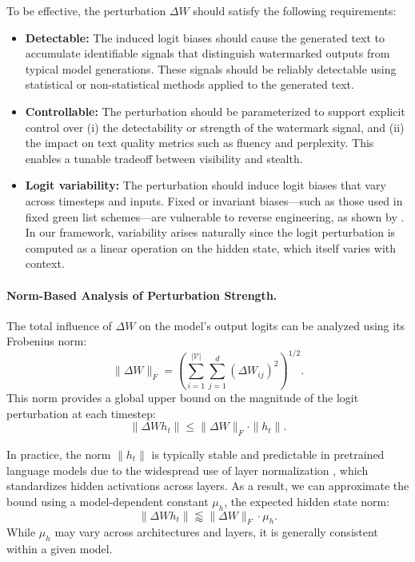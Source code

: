 To be effective, the perturbation \( \Delta W \) should satisfy the following requirements:

\begin{itemize}
    \item \textbf{Detectable:} The induced logit biases should cause the generated text to accumulate identifiable signals that distinguish watermarked outputs from typical model generations. These signals should be reliably detectable using statistical or non-statistical methods applied to the generated text.


    \item \textbf{Controllable:} The perturbation should be parameterized to support explicit control over (i) the detectability or strength of the watermark signal, and (ii) the impact on text quality metrics such as fluency and perplexity. This enables a tunable tradeoff between visibility and stealth.

    \item \textbf{Logit variability:} The perturbation should induce logit biases that vary across timesteps and inputs. Fixed or invariant biases—such as those used in fixed green list schemes—are vulnerable to reverse engineering, as shown by \citet{rastogi2024revisitingrobustness}. In our framework, variability arises naturally since the logit perturbation is computed as a linear operation on the hidden state, which itself varies with context.

\end{itemize}

\paragraph{Norm-Based Analysis of Perturbation Strength.}
The total influence of \( \Delta W \) on the model's output logits can be analyzed using its Frobenius norm:
\[
    \|\Delta W\|_F = \left( \sum_{i=1}^{|\mathcal{V}|} \sum_{j=1}^{d} (\Delta W_{ij})^2 \right)^{1/2}.
\]
This norm provides a global upper bound on the magnitude of the logit perturbation at each timestep:
\[
    \|\Delta W h_t\| \leq \|\Delta W\|_F \cdot \|h_t\|.
\]

In practice, the norm \( \|h_t\| \) is typically stable and predictable in pretrained language models due to the widespread use of layer normalization \citep{ba2016layer}, which standardizes hidden activations across layers. As a result, we can approximate the bound using a model-dependent constant \( \mu_h \), the expected hidden state norm:
\[
    \|\Delta W h_t\| \lessapprox \|\Delta W\|_F \cdot \mu_h.
\]
While \( \mu_h \) may vary across architectures and layers, it is generally consistent within a given model.

